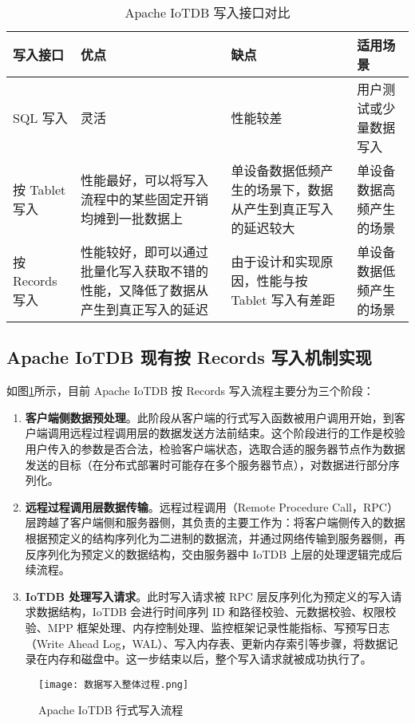 \begin{table}
  \centering
  \caption{Apache IoTDB 写入接口对比}
  \begin{tabular}{lp{3.5cm}p{3.5cm}p{3.5cm}}
    \toprule
    写入接口  & 优点 & 缺点 & 适用场景 \\
    \midrule
    SQL 写入 & 灵活 & 性能较差 & 用户测试或少量数据写入 \\
    按 Tablet 写入  & 性能最好，可以将写入流程中的某些固定开销均摊到一批数据上 & 单设备数据低频产生的场景下，数据从产生到真正写入的延迟较大 & 单设备数据高频产生的场景\\
    按 Records 写入  & 性能较好，即可以通过批量化写入获取不错的性能，又降低了数据从产生到真正写入的延迟 & 由于设计和实现原因，性能与按 Tablet 写入有差距 & 单设备数据低频产生的场景 \\
    \bottomrule
  \end{tabular}
  \label{tab:iotdbwriteinterfacecompare}
\end{table}

\subsection{Apache IoTDB 现有按 Records 写入机制实现}
如图\ref{fig:iotdb-write-process}所示，目前 Apache IoTDB 按 Records 写入流程主要分为三个阶段：
\begin{enumerate}
  \item \textbf{客户端侧数据预处理}。此阶段从客户端的行式写入函数被用户调用开始，到客户端调用远程过程调用层的数据发送方法前结束。这个阶段进行的工作是校验用户传入的参数是否合法，检验客户端状态，选取合适的服务器节点作为数据发送的目标（在分布式部署时可能存在多个服务器节点），对数据进行部分序列化。
  \item \textbf{远程过程调用层数据传输}。远程过程调用（Remote Procedure Call，RPC）层跨越了客户端侧和服务器侧，其负责的主要工作为：将客户端侧传入的数据根据预定义的结构序列化为二进制的数据流，并通过网络传输到服务器侧，再反序列化为预定义的数据结构，交由服务器中 IoTDB 上层的处理逻辑完成后续流程。
  \item \textbf{IoTDB 处理写入请求}。此时写入请求被 RPC 层反序列化为预定义的写入请求数据结构，IoTDB 会进行时间序列 ID 和路径校验、元数据校验、权限校验、MPP 框架处理、内存控制处理、监控框架记录性能指标、写预写日志（Write Ahead Log，WAL）、写入内存表、更新内存索引等步骤，将数据记录在内存和磁盘中。这一步结束以后，整个写入请求就被成功执行了。
\end{enumerate}
\begin{figure}
  \centering
  \texttt{[image: 数据写入整体过程.png]}
  \caption{Apache IoTDB 行式写入流程}
  \label{fig:iotdb-write-process}
\end{figure}
